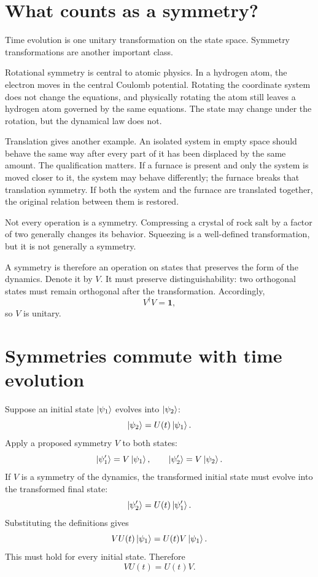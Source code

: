 \section{What counts as a symmetry?}

Time evolution is one unitary transformation on the state space. Symmetry transformations are another important class.

Rotational symmetry is central to atomic physics. In a hydrogen atom, the electron moves in the central Coulomb potential. Rotating the coordinate system does not change the equations, and physically rotating the atom still leaves a hydrogen atom governed by the same equations. The state may change under the rotation, but the dynamical law does not.

Translation gives another example. An isolated system in empty space should behave the same way after every part of it has been displaced by the same amount. The qualification matters. If a furnace is present and only the system is moved closer to it, the system may behave differently; the furnace breaks that translation symmetry. If both the system and the furnace are translated together, the original relation between them is restored.

Not every operation is a symmetry. Compressing a crystal of rock salt by a factor of two generally changes its behavior. Squeezing is a well-defined transformation, but it is not generally a symmetry.

A symmetry is therefore an operation on states that preserves the form of the dynamics. Denote it by \(V\). It must preserve distinguishability: two orthogonal states must remain orthogonal after the transformation. Accordingly,
\begin{equation}
V^\dagger V=\mathbf 1,
\end{equation}
so \(V\) is unitary.

\section{Symmetries commute with time evolution}

Suppose an initial state \(\left\lvert\psi_1\right\rangle\) evolves into \(\left\lvert\psi_2\right\rangle\):
\begin{equation}
\left\lvert\psi_2\right\rangle=U(t)\left\lvert\psi_1\right\rangle.
\end{equation}
Apply a proposed symmetry \(V\) to both states:
\begin{equation}
\left\lvert\psi_1'\right\rangle=V\left\lvert\psi_1\right\rangle,
\qquad
\left\lvert\psi_2'\right\rangle=V\left\lvert\psi_2\right\rangle.
\end{equation}
If \(V\) is a symmetry of the dynamics, the transformed initial state must evolve into the transformed final state:
\begin{equation}
\left\lvert\psi_2'\right\rangle=U(t)\left\lvert\psi_1'\right\rangle.
\end{equation}
Substituting the definitions gives
\begin{equation}
VU(t)\left\lvert\psi_1\right\rangle
=
U(t)V\left\lvert\psi_1\right\rangle.
\end{equation}
This must hold for every initial state. Therefore
\begin{equation}
VU(t)=U(t)V.
\end{equation}

